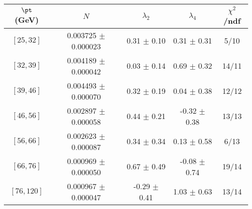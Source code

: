 \begin{tabular}{c||c|c|c|c}
$\pt$ (GeV) & $N$ & $\lambda_{2}$ & $\lambda_4$  & $\chi^2$/ndf  \\
\hline
$[25, 32]$ & 0.003725 $\pm$ 0.000023 & 0.31 $\pm$ 0.10 & 0.31 $\pm$ 0.31 & 5/10\\
$[32, 39]$ & 0.004189 $\pm$ 0.000042 & 0.03 $\pm$ 0.14 & 0.69 $\pm$ 0.32 & 14/11\\
$[39, 46]$ & 0.004493 $\pm$ 0.000070 & 0.32 $\pm$ 0.19 & 0.04 $\pm$ 0.38 & 12/12\\
$[46, 56]$ & 0.002897 $\pm$ 0.000058 & 0.44 $\pm$ 0.21 & -0.32 $\pm$ 0.38 & 13/13\\
$[56, 66]$ & 0.002623 $\pm$ 0.000087 & 0.34 $\pm$ 0.34 & 0.13 $\pm$ 0.58 & 6/13\\
$[66, 76]$ & 0.000969 $\pm$ 0.000050 & 0.67 $\pm$ 0.49 & -0.08 $\pm$ 0.74 & 19/14\\
$[76, 120]$ & 0.000967 $\pm$ 0.000047 & -0.29 $\pm$ 0.41 & 1.03 $\pm$ 0.63 & 13/14\\
\end{tabular}
